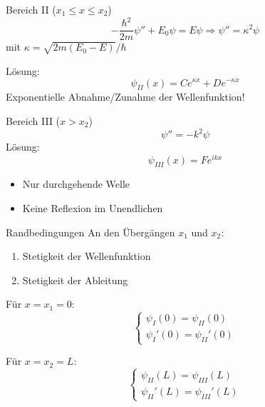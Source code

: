 \documentclass{beamer}
\begin{document}
    \begin{frame}{Bereich II ($x_1 ≤ x ≤ x_2$)}
        \[
            -\frac{\hbar^2}{2m}\psi'' + E_0\psi = E\psi \Rightarrow \psi'' = \kappa^2\psi
        \]
        mit $\kappa = \sqrt{2m(E_0 - E)}/\hbar$

        Lösung:
        \[
            \psi_{II}(x) = Ce^{\kappa x} + De^{-\kappa x}
        \]
        Exponentielle Abnahme/Zunahme der Wellenfunktion!
    \end{frame}

    \begin{frame}{Bereich III ($x > x_2$)}
        \[
            \psi'' = -k^2\psi
        \]
        Lösung:
        \[
            \psi_{III}(x) = Fe^{ikx}
        \]
        \begin{itemize}
            \item Nur durchgehende Welle
            \item Keine Reflexion im Unendlichen
        \end{itemize}
    \end{frame}

    \begin{frame}{Randbedingungen}
        An den Übergängen $x_1$ und $x_2$:
        \begin{enumerate}
            \item Stetigkeit der Wellenfunktion
            \item Stetigkeit der Ableitung
        \end{enumerate}

        Für $x = x_1 = 0$:
        \[
            \begin{cases}
                \psi_I(0) = \psi_{II}(0) \\
                \psi_I'(0) = \psi_{II}'(0)
            \end{cases}
        \]

        Für $x = x_2 = L$:
        \[
            \begin{cases}
                \psi_{II}(L) = \psi_{III}(L) \\
                \psi_{II}'(L) = \psi_{III}'(L)
            \end{cases}
        \]
    \end{frame}
\end{document}
